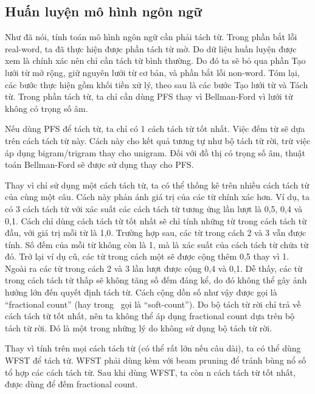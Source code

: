 \documentclass[a4paper,oneside,14pt]{extbook} %
\begin{document}
\subsection{Huấn luyện mô hình ngôn ngữ}

Như đã nói, tính toán mô hình ngôn ngữ cần phải tách từ. Trong phần
bắt lỗi real-word, ta đã thực hiện được phần tách từ mờ. Do dữ liệu
huấn luyện được xem là chính xác nên chỉ cần tách từ bình thường. Do
đó ta sẽ bỏ qua phần Tạo lưới từ mở rộng, giữ nguyên lưới từ cơ
bản, và phần bắt lỗi non-word. Tóm lại, các bước thực hiện gồm khối
tiền xử lý, theo sau là các bước Tạo lưới từ và Tách từ. Trong phần
tách từ, ta chỉ cần dùng PFS thay vì Bellman-Ford vì lưới từ không có
trọng số âm.


Nếu dùng PFS để tách từ, ta chỉ có 1 cách tách từ tốt nhất. Việc đếm
từ sẽ dựa trên cách tách từ này. Cách này cho kết quả tương tự như bộ
tách từ rời, trừ việc áp dụng bi\-gram/tri\-gram thay cho uni\-gram. Đối với
đồ thị có trọng số âm, thuật toán Bellman-Ford sẽ được sử dụng thay
cho PFS.

Thay vì chỉ sử dụng một cách tách từ, ta có thể thống kê trên nhiều
cách tách từ của cùng một câu. Cách này phản ánh
giá trị của các từ chính xác hơn. Ví dụ, ta có 3 cách tách từ với xác
suất các cách tách từ tương ứng lần lượt là 0,5, 0,4 và 0,1. Cách chỉ
dùng cách tách từ tốt nhất sẽ chỉ tính những từ trong cách tách từ
đầu, với giá trị mỗi từ là 1,0. 
Trường hợp sau, các từ trong cách 2 và 3 vẫn được
tính. Số đếm của mỗi từ không còn là 1, mà là xác suất của cách tách
từ chứa từ đó. Trở lại ví dụ cũ, các từ trong cách một sẽ được cộng thêm
0,5 thay vì 1. Ngoài ra các từ trong cách 2 và 3 lần lượt được cộng
0,4 và 0,1. Dễ thấy, các từ trong cách tách từ thấp sẽ không tăng số
đếm đáng kể, do đó không thể gây ảnh hưởng lớn đến quyết định tách
từ.
Cách cộng dồn số như vậy được gọi là ``fractional count'' (hay
trong~\cite{softcount} gọi là ``soft-count''). Do bộ tách từ rời chỉ
trả về cách tách từ tốt nhất, nên ta không thể áp dụng fractional
count dựa trên bộ tách từ rời. Đó là một trong những lý do không sử
dụng bộ tách từ rời.

Thay vì tính trên mọi cách tách từ (có thể rất lớn nếu câu dài), ta có
thể dùng WFST
 để tách  
từ. WFST phải dùng kèm với beam pruning để tránh bùng nổ số tổ hợp các
cách tách từ. Sau khi dùng WFST, ta còn n cách tách từ tốt nhất, được
dùng để đếm fractional count.
\end{document}
